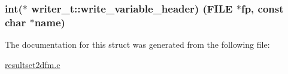 \subsubsection[{\texorpdfstring{write\+\_\+variable\+\_\+header}{write_variable_header}}]{\setlength{\rightskip}{0pt plus 5cm}int($\ast$ writer\+\_\+t\+::write\+\_\+variable\+\_\+header) (F\+I\+LE $\ast$fp, const char $\ast$name)}\hypertarget{structwriter__t_a1ab7bd7ba5e613d693b63101f690b2f7}{}\label{structwriter__t_a1ab7bd7ba5e613d693b63101f690b2f7}


The documentation for this struct was generated from the following file\+:\begin{DoxyCompactItemize}
\item 
\hyperlink{resultset2dfm_8c}{resultset2dfm.\+c}\end{DoxyCompactItemize}

